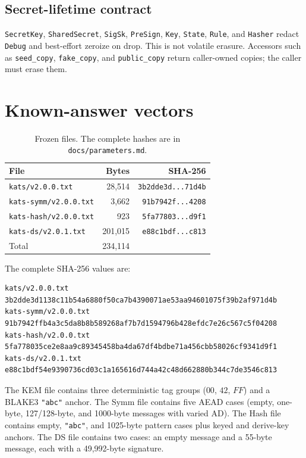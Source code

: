 \documentclass[11pt,a4paper]{article}
\theoremstyle{plain}
\theoremstyle{definition}
\theoremstyle{remark}
\begin{document}
\subsection{Secret-lifetime contract}

\texttt{SecretKey}, \texttt{SharedSecret}, \texttt{SigSk},
\texttt{PreSign}, \texttt{Key}, \texttt{State}, \texttt{Rule}, and
\texttt{Hasher} redact \texttt{Debug} and best-effort zeroize on drop.
This is not volatile erasure.  Accessors such as
\texttt{seed\_copy}, \texttt{fake\_copy}, and \texttt{public\_copy}
return caller-owned copies; the caller must erase them.

\section{Known-answer vectors}
\label{sec:kat}

\begin{table}[t]
\centering
\small
\begin{tabular}{@{}lrr@{}}
\toprule
File & Bytes & SHA-256 \\
\midrule
\texttt{kats/v2.0.0.txt} & 28,514 &
  \texttt{3b2dde3d...71d4b} \\
\texttt{kats-symm/v2.0.0.txt} & 3,662 &
  \texttt{91b7942f...4208} \\
\texttt{kats-hash/v2.0.0.txt} & 923 &
  \texttt{5fa77803...d9f1} \\
\texttt{kats-ds/v2.0.1.txt} & 201,015 &
  \texttt{e88c1bdf...c813} \\
\midrule
Total & 234,114 & \\
\bottomrule
\end{tabular}
\caption{Frozen files.  The complete hashes are in
\texttt{docs/parameters.md}.}
\label{tab:kat}
\end{table}

The complete SHA-256 values are:

\begin{verbatim}
kats/v2.0.0.txt
3b2dde3d1138c11b54a6880f50ca7b4390071ae53aa94601075f39b2af971d4b
kats-symm/v2.0.0.txt
91b7942ffb4a3c5da8b8b589268af7b7d1594796b428efdc7e26c567c5f04208
kats-hash/v2.0.0.txt
5fa778035ce2e8aa9c89345458ba4da67df4bdbe71a456cbb58026cf9341d9f1
kats-ds/v2.0.1.txt
e88c1bdf54e9390736cd03c1a165616d744a42c48d662880b344c7de3546c813
\end{verbatim}

The KEM file contains three deterministic tag groups
($00$, $42$, $FF$) and a BLAKE3 \texttt{"abc"} anchor.  The Symm file
contains five AEAD cases (empty, one-byte, 127/128-byte, and 1000-byte
messages with varied AD).  The Hash file contains empty, \texttt{"abc"},
and 1025-byte pattern cases plus keyed and derive-key anchors.  The DS
file contains two cases: an empty message and a 55-byte message, each
with a 49,992-byte signature.
\end{document}
